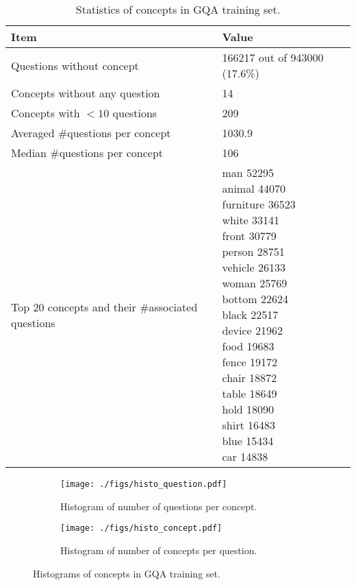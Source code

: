 \documentclass{article} \usepackage{iclr2022_conference,times}
\begin{document}
\begin{table}[h]
    \centering
    \begin{tabular}{l|l}
    \toprule
    Item & Value \\
    \midrule  
    Questions without concept & 166217 out of 943000 (17.6\%)\\
    Concepts without any question & 14 \\
    Concepts with $<10$ questions & 209\\
    Averaged \#questions per concept & 1030.9\\
    Median \#questions per concept & 106\\
    \midrule
    Top 20 concepts and their \#associated questions & \makecell[tl]{
\small{man 52295}\\
\small{animal 44070}\\
\small{furniture 36523}\\
\small{white 33141}\\
\small{front 30779}\\
\small{person 28751}\\
\small{vehicle 26133}\\
\small{woman 25769}\\
\small{bottom 22624}\\
\small{black 22517}\\
\small{device 21962}\\
\small{food 19683}\\
\small{fence 19172}\\
\small{chair 18872}\\
\small{table 18649}\\
\small{hold 18090}\\
\small{shirt 16483}\\
\small{blue 15434}\\
\small{car 14838}\\
} \\
    \bottomrule
    \end{tabular}
    \caption{Statistics of concepts in GQA training set.}
    \label{tab:gqa_concepts}
\end{table}

\begin{figure}[h]
    \centering
     \begin{subfigure}[b]{0.48\textwidth}
         \centering
    \texttt{[image: ./figs/histo\_question.pdf]}
    \caption{Histogram of number of questions per concept.}
    \label{fig:histo_question}
     \end{subfigure}
     \hfill
    \begin{subfigure}[b]{0.48\textwidth}
         \centering
         \texttt{[image: ./figs/histo\_concept.pdf]}
         \caption{Histogram of number of concepts per question.}
    \label{fig:histo_concept}
     \end{subfigure}
     \caption{Histograms of concepts in GQA training set.}
\end{figure}
\end{document}
